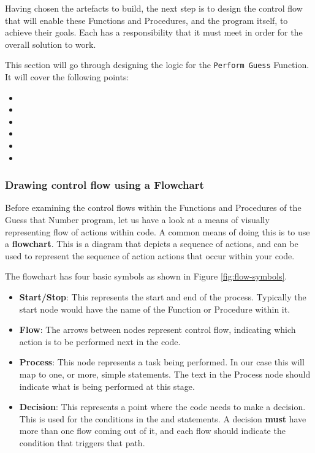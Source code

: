 Having chosen the artefacts to build, the next step is to design the control flow that will enable these Functions and Procedures, and the program itself, to achieve their goals. Each has a responsibility that it must meet in order for the overall solution to work. 

This section will go through designing the logic for the \texttt{Perform Guess} Function. It will cover the following points: 
\begin{itemize}
  \item {}
  \item {}
  \item {}
  \item {}
  \item {}
  \item {}
\end{itemize}

\subsubsection{Drawing control flow using a Flowchart} %
\label{ssub:flow_charts}

Before examining the control flows within the Functions and Procedures of the Guess that Number program, let us have a look at a means of visually representing flow of actions within code. A common means of doing this is to use a \textbf{flowchart}. This is a diagram that depicts a sequence of actions, and can be used to represent the sequence of action actions that occur within your code.

The flowchart has four basic symbols as shown in Figure \ref{fig:flow-symbols}.
\begin{itemize}
  \item \textbf{Start/Stop}: This represents the start and end of the process. Typically the start node would have the name of the Function or Procedure within it.
  \item \textbf{Flow}: The arrows between nodes represent control flow, indicating which action is to be performed next in the code.
  \item \textbf{Process}: This node represents a task being performed. In our case this will map to one, or more, simple statements. The text in the Process node should indicate what is being performed at this stage.
  \item \textbf{Decision}: This represents a point where the code needs to make a decision. This is used for the conditions in the  and  statements. A decision \textbf{must} have more than one flow coming out of it, and each flow should indicate the condition that triggers that path.
\end{itemize}

